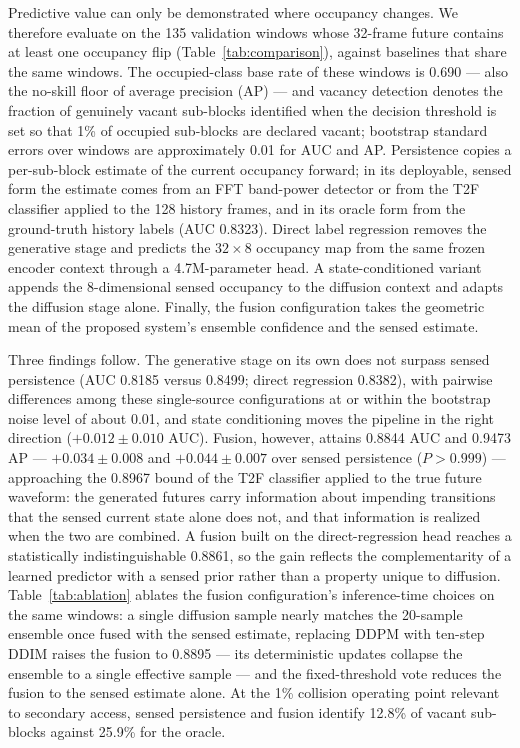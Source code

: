 \documentclass[lettersize,journal]{IEEEtran}
\begin{document}
Predictive value can only be demonstrated where occupancy changes. We therefore evaluate on the 135 validation windows whose 32-frame future contains at least one occupancy flip (Table~\ref{tab:comparison}), against baselines that share the same windows. The occupied-class base rate of these windows is 0.690 — also the no-skill floor of average precision (AP) — and vacancy detection denotes the fraction of genuinely vacant sub-blocks identified when the decision threshold is set so that 1\% of occupied sub-blocks are declared vacant; bootstrap standard errors over windows are approximately 0.01 for AUC and AP. Persistence copies a per-sub-block estimate of the current occupancy forward; in its deployable, sensed form the estimate comes from an FFT band-power detector or from the T2F classifier applied to the 128 history frames, and in its oracle form from the ground-truth history labels (AUC 0.8323). Direct label regression removes the generative stage and predicts the $32\times8$ occupancy map from the same frozen encoder context through a 4.7M-parameter head. A state-conditioned variant appends the 8-dimensional sensed occupancy to the diffusion context and adapts the diffusion stage alone. Finally, the fusion configuration takes the geometric mean of the proposed system's ensemble confidence and the sensed estimate.

Three findings follow. The generative stage on its own does not surpass sensed persistence (AUC 0.8185 versus 0.8499; direct regression 0.8382), with pairwise differences among these single-source configurations at or within the bootstrap noise level of about 0.01, and state conditioning moves the pipeline in the right direction ($+0.012 \pm 0.010$ AUC). Fusion, however, attains 0.8844 AUC and 0.9473 AP — $+0.034 \pm 0.008$ and $+0.044 \pm 0.007$ over sensed persistence ($P>0.999$) — approaching the 0.8967 bound of the T2F classifier applied to the true future waveform: the generated futures carry information about impending transitions that the sensed current state alone does not, and that information is realized when the two are combined. A fusion built on the direct-regression head reaches a statistically indistinguishable 0.8861, so the gain reflects the complementarity of a learned predictor with a sensed prior rather than a property unique to diffusion. Table~\ref{tab:ablation} ablates the fusion configuration's inference-time choices on the same windows: a single diffusion sample nearly matches the 20-sample ensemble once fused with the sensed estimate, replacing DDPM with ten-step DDIM raises the fusion to 0.8895 — its deterministic updates collapse the ensemble to a single effective sample — and the fixed-threshold vote reduces the fusion to the sensed estimate alone. At the 1\% collision operating point relevant to secondary access, sensed persistence and fusion identify 12.8\% of vacant sub-blocks against 25.9\% for the oracle.
\end{document}
